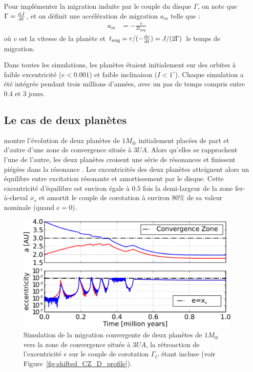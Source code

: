 Pour implémenter la migration induite par le couple du disque $\Gamma$, on note que $\Gamma=\od{J}{t}$, et on définit une accélération de migration $a_m$ telle que :
\begin{align}
a_m &= - \frac{v}{2 t_\text{mig}}
\end{align}
où $v$ est la vitesse de la planète et $t_\text{mig}=r/(-\od{r}{t})=J/(2\Gamma)$\citep[eq. 
(69)]{tanaka2002three} le temps de migration.

\bigskip

Dans toutes les simulations, les planètes étaient initialement sur des orbites à faible excentricité ($e<0.001$) et faible inclinaison ($I<1^\circ$). Chaque simulation a été intégrée pendant trois millions d'années, avec un pas de temps compris entre $0.4$ et $3$ jours.

\subsection{Le cas de deux planètes}
 montre l'évolution de deux planètes de $1\unit{M_\oplus}$ initialement placées de part et d'autre d'une zone de convergence située à $3\unit{UA}$. Alors qu'elles se rapprochent l'une de l'autre, les deux planètes croisent une série de résonances et finissent piégées dans la résonance . Les excentricités des deux planètes atteignent alors un équilibre entre excitation résonante et amortissement par le disque. Cette excentricité d'équilibre est environ égale à $0.5$ fois la demi-largeur de la zone fer-à-cheval $x_s$ et amortit le couple de corotation à environ $80\%$ de sa valeur nominale (quand $e=0$). 

\begin{figure}[htbp]
\centering
\includegraphics[width=\linewidth]{figure/shifted/corotation_damping_influence.pdf}
\caption[Effet de l'amortissement du couple de corotation dans un cas à deux planètes.]{Simulation de la migration convergente
de deux planètes de $1\unit{M_\oplus}$ vers la zone de convergence située à $3\unit{UA}$, la rétroaction de l'excentricité $e$
sur le couple de corotation $\Gamma_C$ étant incluse (voir Figure~\ref{fig:shifted_CZ_D_profile}).}
\label{fig:two-planets}
\end{figure}

